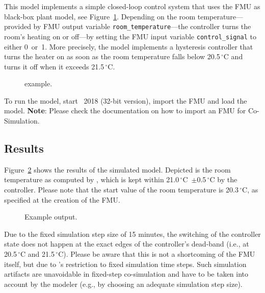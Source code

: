 This model implements a simple closed-loop control system that uses the FMU as black-box plant model, see Figure~\ref{fig:dymola_example}.
Depending on the room temperature---provided by FMU output variable \verb!room_temperature!---the controller turns the room's heating on or off---by setting the FMU input variable \verb!control_signal! to either 0~or~1.
More precisely, the model implements a hysteresis controller that turns the heater on as soon as the room temperature falls below 20.5$\,^\circ$C and turns it off when it exceeds 21.5$\,^\circ$C.

\begin{figure}[h!]
\caption{\dymola example.}
\label{fig:dymola_example}
\end{figure}

To run the model, start \dymola~2018 (32-bit version), import the FMU and load the \dymola model. \textbf{Note}: Please check the \dymola documentation on how to import an FMU for Co-Simulation.


\subsection{Results}
\label{sec:example:results}

Figure~\ref{fig:dymola_output} shows the results of the simulated \dymola model.
Depicted is the room temperature as computed by \trnsys, which is kept within 21.0$\,^\circ$C~$\pm$0.5$\,^\circ$C by the \dymola controller.
Please note that the start value of the room temperature is 20.3$\,^\circ$C, as specified at the creation of the FMU.

\begin{figure}[h!]
\caption{Example \dymola output.}
\label{fig:dymola_output}
\end{figure}

Due to the fixed simulation step size of 15 minutes, the switching of the controller state does not happen at the exact edges of the controller's dead-band (i.e., at 20.5$\,^\circ$C and 21.5$\,^\circ$C).
Please be aware that this is not a shortcoming of the FMU itself, but due to \trnsys's restriction to fixed simulation time steps.
Such simulation artifacts are unavoidable in fixed-step co-simulation and have to be taken into account by the modeler (e.g., by choosing an adequate simulation step size).
